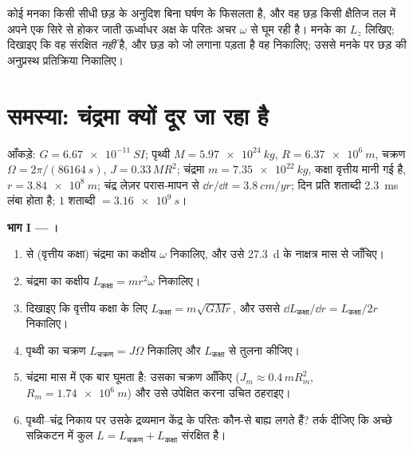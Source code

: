 \begin{exercise}[$\star\star\star$]\label{exo:b1:angular-momentum:12}
कोई मनका किसी सीधी छड़ के अनुदिश बिना घर्षण के फिसलता है, और वह छड़ किसी
क्षैतिज तल में अपने एक सिरे से होकर जाती ऊर्ध्वाधर अक्ष के परितः अचर
$\omega$ से घूम रही है। मनके का $L_z$ लिखिए; दिखाइए कि वह संरक्षित
\emph{नहीं} है, और छड़ को जो  लगाना पड़ता है वह निकालिए; उससे मनके पर
छड़ की अनुप्रस्थ प्रतिक्रिया निकालिए।
\end{exercise}

\section{समस्या: चंद्रमा क्यों दूर जा रहा है}

\begin{problem}
\label{pb:b1:angular-momentum:1}
आँकड़े: $G = \qty{6.67e-11}{SI}$; पृथ्वी $M = \qty{5.97e24}{kg}$, $R =
\qty{6.37e6}{m}$, चक्रण $\Omega = 2\pi/(\qty{86164}{s})$, 
$J = 0.33\,MR^2$; चंद्रमा $m = \qty{7.35e22}{kg}$, कक्षा वृत्तीय मानी गई है,
$r = \qty{3.84e8}{m}$; चंद्र लेज़र परास-मापन से
$\dd r/\dd t = \qty{3.8}{cm/yr}$; दिन प्रति शताब्दी \qty{2.3}{ms} लंबा होता
है; $1$ शताब्दी $= \qty{3.16e9}{s}$।

\medskip
\noindent\textbf{भाग I --- ।}
\begin{enumerate}
  \item {} से (वृत्तीय कक्षा) चंद्रमा का कक्षीय 
        $\omega$ निकालिए, और उसे \qty{27.3}{d} के नाक्षत्र मास से जाँचिए।
  \item चंद्रमा का कक्षीय  $L_{\text{कक्षा}} =
        mr^2\omega$ निकालिए।
  \item दिखाइए कि वृत्तीय कक्षा के लिए $L_{\text{कक्षा}} = m\sqrt{GMr}$, और
        उससे $\dd L_{\text{कक्षा}}/\dd r = L_{\text{कक्षा}}/2r$ निकालिए।
  \item पृथ्वी का चक्रण  $L_{\text{चक्रण}} =
        J\Omega$ निकालिए और $L_{\text{कक्षा}}$ से तुलना कीजिए।
  \item चंद्रमा मास में एक बार घूमता है: उसका चक्रण  आँकिए
        ($J_m \approx 0.4\,mR_m^2$, $R_m = \qty{1.74e6}{m}$) और उसे उपेक्षित
        करना उचित ठहराइए।
  \item पृथ्वी--चंद्र निकाय पर उसके द्रव्यमान केंद्र के परितः कौन-से बाह्य
         लगते हैं? तर्क दीजिए कि अच्छे सन्निकटन में कुल
        $L = L_{\text{चक्रण}} + L_{\text{कक्षा}}$ संरक्षित है।
\end{enumerate}


\end{problem}
